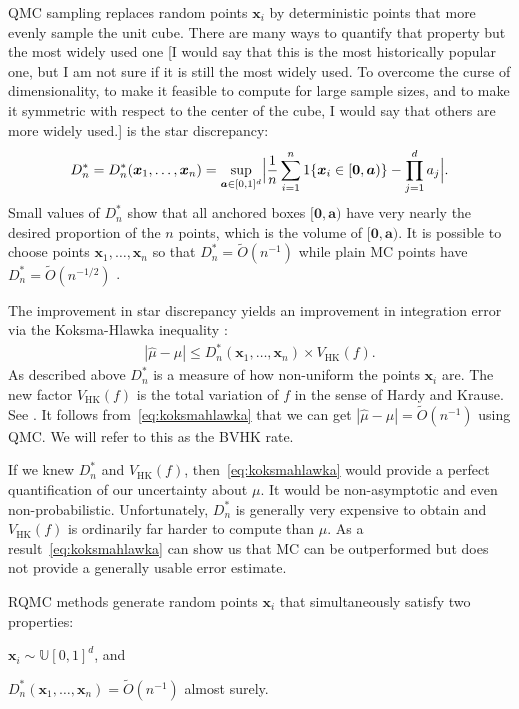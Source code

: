 \documentclass{article}
\newcommand{\fred}[1]{\begingroup\color{red}#1\endgroup}
\renewcommand{\le}{\leqslant}
\newcommand{\bsa}{\boldsymbol{a}}
\newcommand{\bsx}{\boldsymbol{x}}
\newcommand{\bszero}{\boldsymbol{0}}
\newcommand{\dunif}{\mathbb{U}}
\newcommand{\hk}{\mathrm{HK}}
\begin{document}
QMC sampling replaces random points $\bsx_i$ by 
deterministic points that more evenly sample the
unit cube.  There are many ways to quantify that 
property but the most widely used one \fred{[I would say that this is the most historically popular one, but I am not sure if it is still the most widely used.  To overcome the curse of dimensionality,  to make it feasible to compute for large sample sizes, and to make it symmetric with respect to the center of the cube, I would say that others are more widely used.] } is the
star discrepancy:
$$
D_n^* = D_n^*(\bsx_1,\dots,\bsx_n)=\sup_{\bsa\in[0,1]^d}
\Bigl| \frac1n\sum_{i=1}^n1\{\bsx_i\in[\bszero,\bsa)\}
-\prod_{j=1}^da_j\Bigr|.
$$
Small values of $D_n^*$ show that all anchored boxes $[\bszero,\bsa)$
have very nearly the desired proportion of the $n$ points,
which is the volume of $[\bszero,\bsa)$.
It is possible to choose points $\bsx_1,\dots,\bsx_n$ so
that $D_n^*=\tilde O(n^{-1})$ while plain MC points
have $D_n^*=\tilde O(n^{-1/2})$ \cite{Nie92}.

The improvement in star discrepancy yields an improvement
in integration error via the Koksma-Hlawka inequality \cite{Hic04a}:
\begin{align}\label{eq:koksmahlawka}
|\hat\mu-\mu|\le D_n^*(\bsx_1,\dots,\bsx_n)\times V_{\hk}(f).
\end{align}
As described above $D_n^*$ is a measure of how non-uniform
the points $\bsx_i$ are. The new factor $V_{\hk}(f)$ is the
total variation of $f$ in the sense of Hardy and Krause.
See \cite{Owe05a}. It follows from~\eqref{eq:koksmahlawka} 
that we can get $|\hat\mu-\mu|=\tilde O(n^{-1})$
using QMC. We will refer to this as the BVHK rate.

If we knew $D_n^*$ and $V_\hk(f)$, then~\eqref{eq:koksmahlawka} would provide a
perfect quantification of our uncertainty about $\mu$.
It would be non-asymptotic and even non-probabilistic.
Unfortunately, $D_n^*$ is generally very expensive
to obtain and $V_{\hk}(f)$ is ordinarily far harder
to compute than $\mu$. As a result~\eqref{eq:koksmahlawka}
can show us that MC can be outperformed but does
not provide a generally usable error estimate.

RQMC methods generate random points $\bsx_i$ that
simultaneously satisfy two properties:
\begin{compactenum}[\quad\bf1)]
\item $\bsx_i\sim\dunif[0,1]^d$, and
\item $D_n^*(\bsx_1,\dots,\bsx_n)=\tilde O(n^{-1})$ almost surely.
\end{compactenum}
\end{document}
